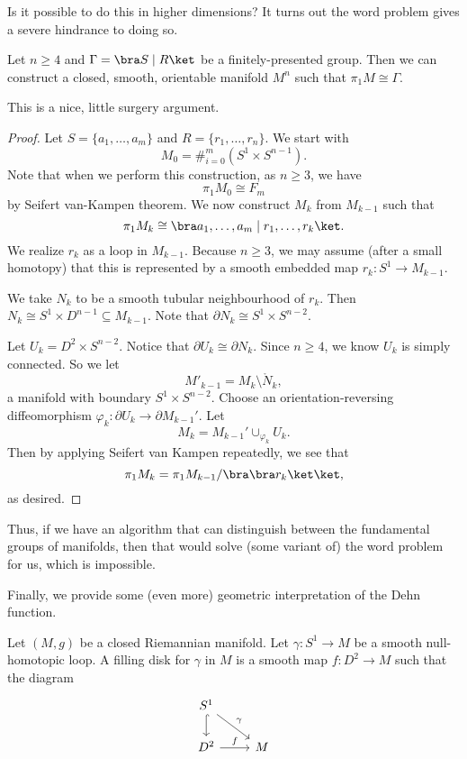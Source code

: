 \documentclass[a4paper]{article}
\begin{document}
Is it possible to do this in higher dimensions? It turns out the word problem gives a severe hindrance to doing so.
\begin{thm}
  Let $n \geq 4$ and $\Gamma = \bra S \mid R\ket$ be a finitely-presented group. Then we can construct a closed, smooth, orientable manifold $M^n$ such that $\pi_1 M \cong \Gamma$.
\end{thm}
This is a nice, little surgery argument.

\begin{proof}
  Let $S = \{a_1, \ldots, a_m\}$ and $R = \{r_1, \ldots, r_n\}$. We start with
  \[
    M_0 = \#_{i = 0}^m (S^1 \times S^{n - 1}).
  \]
  Note that when we perform this construction, as $n \geq 3$, we have
  \[
    \pi_1M_0 \cong F_m
  \]
  by Seifert van-Kampen theorem. We now construct $M_k$ from $M_{k - 1}$ such that
  \[
    \pi_1 M_k \cong \bra a_1, \ldots, a_m \mid r_1, \ldots, r_k\ket.
  \]
  We realize $r_k$ as a loop in $M_{k - 1}$. Because $n \geq 3$, we may assume (after a small homotopy) that this is represented by a smooth embedded map $r_k: S^1 \to M_{k - 1}$.

  We take $N_k$ to be a smooth tubular neighbourhood of $r_k$. Then $N_k \cong S^1 \times D^{n - 1} \subseteq M_{k - 1}$. Note that $\partial N_k \cong S^1 \times S^{n - 2}$.

  Let $U_k = D^2 \times S^{n - 2}$. Notice that $\partial U_k \cong \partial N_k$. Since $n \geq 4$, we know $U_k$ is simply connected. So we let
  \[
    M'_{k - 1} = M_k \setminus \mathring{N}_k,
  \]
  a manifold with boundary $S^1 \times S^{n - 2}$. Choose an orientation-reversing diffeomorphism $\varphi_k: \partial U_k \to \partial M_{k - 1}'$. Let
  \[
    M_k = M_{k - 1}' \cup_{\varphi_k} U_k.
  \]
  Then by applying Seifert van Kampen repeatedly, we see that
  \[
    \pi_1 M_k = \pi_1 M_{k - 1} / \bra \bra r_k \ket \ket,
  \]
  as desired.
\end{proof}
Thus, if we have an algorithm that can distinguish between the fundamental groups of manifolds, then that would solve (some variant of) the word problem for us, which is impossible.

Finally, we provide some (even more) geometric interpretation of the Dehn function.

\begin{defi}
  Let $(M, g)$ be a closed Riemannian manifold. Let $\gamma: S^1 \to M$ be a smooth null-homotopic loop. A filling disk for $\gamma$ in $M$ is a smooth map $f: D^2 \to M$ such that the diagram
  \[
    \begin{tikzcd}
      S^1 \ar[d, hook] \ar[rd, "\gamma"] \\
      D^2 \ar[r, "f"] & M
    \end{tikzcd}
  \]
\end{defi}
\end{document}
